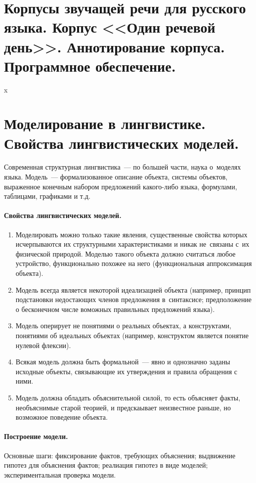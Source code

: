 \documentclass[12pt]{article}
\theoremstyle{definition}
\theoremstyle{remark}
\numberwithin{equation}{section}
\begin{document}
\section{Корпусы звучащей речи для русского языка. Корпус <<Один речевой день>>. Аннотирование корпуса. Программное обеспечение.}
x
\section{Моделирование в лингвистике.  Свойства лингвистических моделей.}
\paragraph{}
Современная структурная лингвистика~--- по большей части, наука о~моделях языка. Модель~--- формализованное описание объекта, системы объектов, выраженное конечным набором предложений какого-либо языка, формулами, таблицами, графиками и т.д.

\paragraph{Свойства лингвистических моделей.}
\begin{enumerate}
	\item Моделировать можно только такие явления, существенные свойства которых исчерпываются их структурными характеристиками и никак не~связаны с~их физической природой. Моделью такого объекта должно считаться любое устройство, функционально похожее на него (функциональная аппроксимация объекта).
	\item Модель всегда является некоторой идеализацией объекта (например, принцип подстановки недостающих членов предложения в~синтаксисе; предположение о бесконечном числе воможных правильных предложений языка).
	\item Модель оперирует не понятиями о реальных объектах, а конструктами, понятиями об идеальных объектах (например, конструктом является понятие нулевой флексии).
	\item Всякая модель должна быть формальной~--- явно и однозначно заданы исходные объекты, связывающие их утверждения и правила обращения с ними.
	\item Модель должна обладать объяснительной силой, то есть объясняет факты, необъяснимые старой теорией, и предскаывает неизвестное раньше, но возможное поведение объекта.
\end{enumerate}

\paragraph{Построение модели.}
Основные шаги: фиксирование фактов, требующих объяснения; выдвижение гипотез для объяснения фактов; реалиация гипотез в виде моделей; экспериментальная проверка модели.
\end{document}
